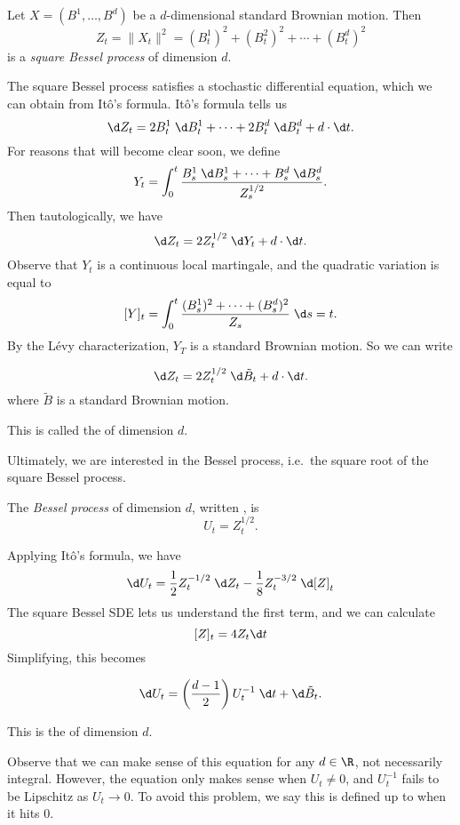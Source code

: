 \documentclass[a4paper]{article}
\begin{document}
\begin{defi}
  Let $X = (B^1, \ldots, B^d)$ be a $d$-dimensional standard Brownian motion. Then
  \[
    Z_t = \|X_t\|^2 = (B^1_t)^2 + (B_t^2)^2 + \cdots + (B_t^d)^2
  \]
  is a \emph{square Bessel process} of dimension $d$.
\end{defi}
The square Bessel process satisfies a stochastic differential equation, which we can obtain from It\^o's formula. It\^o's formula tells us
\[
  \d Z_t = 2B_t^1 \;\d B_t^1 + \cdots + 2 B_t^d\;\d B_t^d + d\cdot \d t.
\]
For reasons that will become clear soon, we define
\[
  Y_t = \int_0^t \frac{B_s^1 \;\d B_s^1 + \cdots + B_s^d \;\d B_s^d}{Z_s^{1/2}}.
\]
Then tautologically, we have
\[
  \d Z_t = 2 Z_t^{1/2} \;\d Y_t + d\cdot \d t.
\]
Observe that $Y_t$ is a continuous local martingale, and the quadratic variation is equal to
\[
  [Y]_t = \int_0^t \frac{(B_s^1)^2 + \cdots + (B_s^d)^2}{Z_s}\;\d s = t.
\]
By the L\'evy characterization, $Y_T$ is a standard Brownian motion. So we can write
\begin{lemma}
  \[
    \d Z_t = 2 Z_t^{1/2} \;\d \tilde{B}_t + d \cdot \d t.
  \]
  where $\tilde{B}$ is a standard Brownian motion.
\end{lemma}
This is called the  of dimension $d$.

Ultimately, we are interested in the Bessel process, i.e.\ the square root of the square Bessel process.
\begin{defi}
  The \emph{Bessel process} of dimension $d$, written , is
  \[
    U_t = Z_t^{1/2}.
  \]
\end{defi}
Applying It\^o's formula, we have
\[
  \d U_t = \frac{1}{2} Z_t^{-1/2} \;\d Z_t - \frac{1}{8} Z_t^{-3/2}\;\d [Z]_t
\]
The square Bessel SDE lets us understand the first term, and we can calculate
\[
  [Z]_t = 4 Z_t \d t
\]
Simplifying, this becomes
\begin{lemma}
  \[
    \d U_t = \left(\frac{d - 1}{2}\right) U_t^{-1}\;\d t + \d \tilde{B}_t.
  \]
\end{lemma}
This is the  of dimension $d$.

Observe that we can make sense of this equation for any $d \in \R$, not necessarily integral. However, the equation only makes sense when $U_t \not= 0$, and $U_t^{-1}$ fails to be Lipschitz as $U_t \to 0$. To avoid this problem, we say this is defined up to when it hits $0$.
\end{document}
